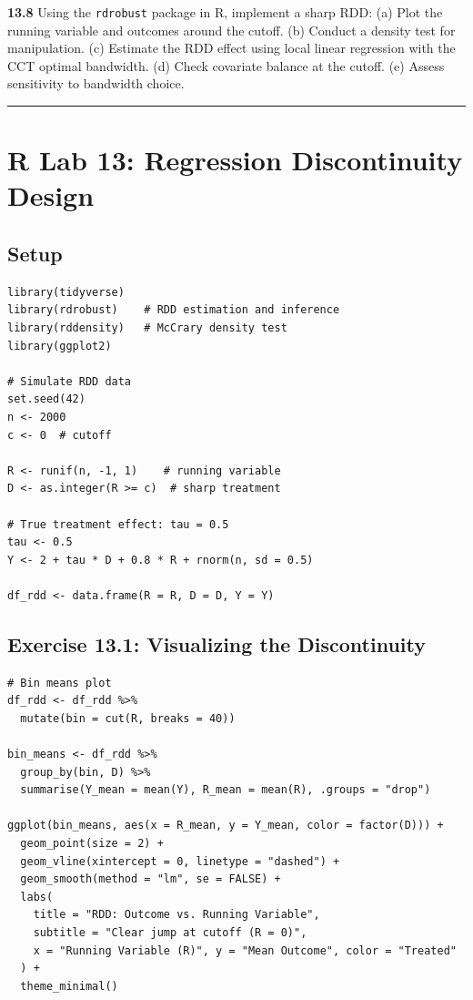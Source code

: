 \textbf{13.8} Using the \texttt{rdrobust} package in R, implement a sharp RDD:
(a) Plot the running variable and outcomes around the cutoff.
(b) Conduct a density test for manipulation.
(c) Estimate the RDD effect using local linear regression with the CCT optimal bandwidth.
(d) Check covariate balance at the cutoff.
(e) Assess sensitivity to bandwidth choice.

\medskip\hrule\medskip

\section{R Lab 13: Regression Discontinuity Design}

\subsection{Setup}

\begin{lstlisting}
library(tidyverse)
library(rdrobust)    # RDD estimation and inference
library(rddensity)   # McCrary density test
library(ggplot2)

# Simulate RDD data
set.seed(42)
n <- 2000
c <- 0  # cutoff

R <- runif(n, -1, 1)    # running variable
D <- as.integer(R >= c)  # sharp treatment

# True treatment effect: tau = 0.5
tau <- 0.5
Y <- 2 + tau * D + 0.8 * R + rnorm(n, sd = 0.5)

df_rdd <- data.frame(R = R, D = D, Y = Y)
\end{lstlisting}

\subsection{Exercise 13.1: Visualizing the Discontinuity}

\begin{lstlisting}
# Bin means plot
df_rdd <- df_rdd %>%
  mutate(bin = cut(R, breaks = 40))

bin_means <- df_rdd %>%
  group_by(bin, D) %>%
  summarise(Y_mean = mean(Y), R_mean = mean(R), .groups = "drop")

ggplot(bin_means, aes(x = R_mean, y = Y_mean, color = factor(D))) +
  geom_point(size = 2) +
  geom_vline(xintercept = 0, linetype = "dashed") +
  geom_smooth(method = "lm", se = FALSE) +
  labs(
    title = "RDD: Outcome vs. Running Variable",
    subtitle = "Clear jump at cutoff (R = 0)",
    x = "Running Variable (R)", y = "Mean Outcome", color = "Treated"
  ) +
  theme_minimal()
\end{lstlisting}

